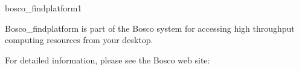 \begin{ManPage}{\label{man-bosco-findplatform}bosco\_findplatform}{1}
{Bosco\_findplatform is part of the Bosco system for accessing high
throughput computing resources from your desktop.

For detailed information, please see the Bosco web site:
}


\end{ManPage}
